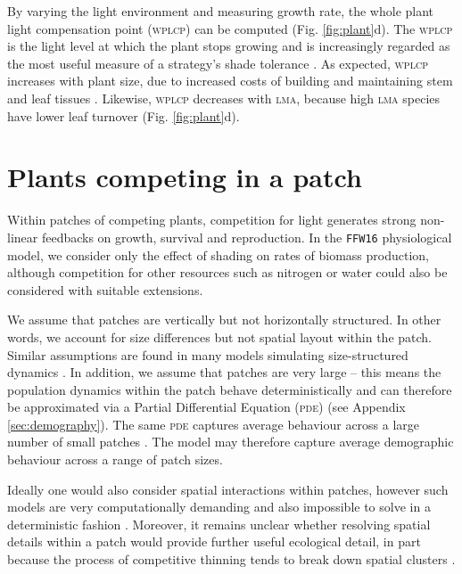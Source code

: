 \documentclass[a4paper,11pt]{article}
\begin{document}
By varying the light environment and measuring growth rate, the whole
plant light compensation point (\textsc{wplcp}) can be computed (Fig.
\ref{fig:plant}d). The \textsc{wplcp} is the light level at which the plant 
stops growing and is increasingly regarded as the most useful
measure of a strategy's shade tolerance
\citep{Givnish-1988, Baltzer-2007, Lusk-2013}. As expected, \textsc{wplcp}
increases with plant size, due to increased costs of building and
maintaining stem and leaf tissues \citep{Givnish-1988}. Likewise, \textsc{wplcp}
decreases with \textsc{lma}, because high \textsc{lma} species have lower leaf turnover
\citep{Baltzer-2007, Lusk-2013} (Fig.
\ref{fig:plant}d).

\section{Plants competing in a patch}

Within patches of competing plants, competition for light generates
strong non-linear feedbacks on growth, survival and reproduction. In the
\texttt{FFW16} physiological model, we consider only the effect of
shading on rates of biomass production, although competition for other
resources such as nitrogen or water could also be considered with
suitable extensions.

We assume that patches are vertically but not horizontally
structured. In other words, we account for size differences but not spatial 
layout within the patch. Similar assumptions are found in many models
simulating size-structured dynamics
\citep{Kohyama-1993, Huston-1987, Moorcroft-2001, Smith-2014}. In addition, 
we assume that patches are very large -- this means the population dynamics 
within the patch behave deterministically \citep{Deroos-1997} and can therefore 
be approximated via a Partial Differential Equation (\textsc{pde}) (see Appendix
\ref{sec:demography}). The same \textsc{pde} captures average behaviour
across a large number of small patches \citep{Moorcroft-2001}. The model may 
therefore capture average demographic behaviour across a range of patch sizes.

Ideally one would also consider spatial interactions within patches,
however such models are very computationally demanding and also
impossible to solve in a deterministic fashion \citep{Huston-1987, 
Pacala-1996}. Moreover, it remains unclear whether resolving spatial details within a
patch would provide further useful ecological detail, in part because the
process of competitive thinning tends to break down spatial clusters
\citep{Strigul-2008}.
\end{document}
